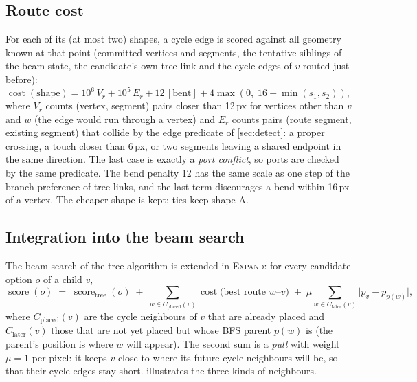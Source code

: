 \documentclass[11pt,a4paper]{article}
\newcommand{\Score}{\operatorname{score}}
\begin{document}
\subsection{Route cost}
\label{sec:routecost}

For each of its (at most two) shapes, a cycle edge is scored against all geometry known at that point (committed vertices and segments, the tentative siblings of the beam state, the candidate's own tree link and the cycle edges of $v$ routed just before):
\[
  \operatorname{cost}(\text{shape}) = 10^6\,V_r + 10^5\,E_r + 12\,[\text{bent}] + 4\max(0,\;16-\min(s_1,s_2)),
\]
where $V_r$ counts (vertex, segment) pairs closer than 12\,px for vertices other than $v$ and $w$ (the edge would run through a vertex) and $E_r$ counts pairs (route segment, existing segment) that collide by the edge predicate of \cref{sec:detect}: a proper crossing, a touch closer than 6\,px, or two segments leaving a shared endpoint in the same direction. The last case is exactly a \emph{port conflict}, so ports are checked by the same predicate. The bend penalty 12 has the same scale as one step of the branch preference of tree links, and the last term discourages a bend within 16\,px of a vertex. The cheaper shape is kept; ties keep shape A.

\subsection{Integration into the beam search}
\label{sec:beam}

The beam search of the tree algorithm is extended in \textsc{Expand}: for every candidate option $o$ of a child $v$,
\[
  \Score(o) \;=\; \Score_{\text{tree}}(o) \;+\; \sum_{w\in C_{\text{placed}}(v)} \operatorname{cost}\bigl(\text{best route } w\text{--}v\bigr) \;+\; \mu \sum_{w\in C_{\text{later}}(v)} \bigl|p_v-p_{p(w)}\bigr|,
\]
where $C_{\text{placed}}(v)$ are the cycle neighbours of $v$ that are already placed and $C_{\text{later}}(v)$ those that are not yet placed but whose BFS parent $p(w)$ is (the parent's position is where $w$ will appear). The second sum is a \emph{pull} with weight $\mu=1$ per pixel: it keeps $v$ close to where its future cycle neighbours will be, so that their cycle edges stay short.  illustrates the three kinds of neighbours.
\end{document}
